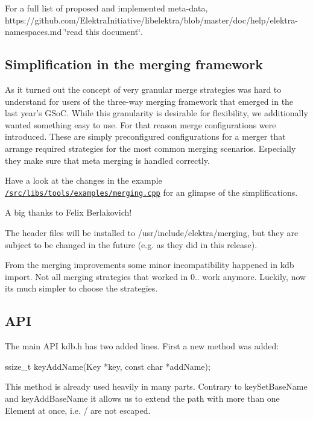 For a full list of proposed and implemented meta-\/data, https\+://github.com/\+Elektra\+Initiative/libelektra/blob/master/doc/help/elektra-\/namespaces.\+md \char`\"{}read this document\char`\"{}.

\subsection*{Simplification in the merging framework}

As it turned out the concept of very granular merge strategies was hard to understand for users of the three-\/way merging framework that emerged in the last year's G\+So\+C. While this granularity is desirable for flexibility, we additionally wanted something easy to use. For that reason merge configurations were introduced. These are simply preconfigured configurations for a merger that arrange required strategies for the most common merging scenarios. Especially they make sure that meta merging is handled correctly.

Have a look at the changes in the example \href{https://github.com/ElektraInitiative/libelektra/blob/master/src/libs/tools/examples/merging.cpp}{\tt /src/libs/tools/examples/merging.cpp} for an glimpse of the simplifications.

A big thanks to Felix Berlakovich!

The header files will be installed to /usr/include/elektra/merging, but they are subject to be changed in the future (e.\+g. as they did in this release).

From the merging improvements some minor incompatibility happened in {\ttfamily kdb import}. Not all merging strategies that worked in 0.. work anymore. Luckily, now its much simpler to choose the strategies.

\subsection*{A\+P\+I}

The main A\+P\+I kdb.\+h has two added lines. First a new method was added\+: \begin{DoxyVerb}ssize_t keyAddName(Key *key, const char *addName);
\end{DoxyVerb}


This method is already used heavily in many parts. Contrary to {\ttfamily key\+Set\+Base\+Name} and {\ttfamily key\+Add\+Base\+Name} it allows us to extend the path with more than one Element at once, i.\+e. {\ttfamily /} are not escaped.

